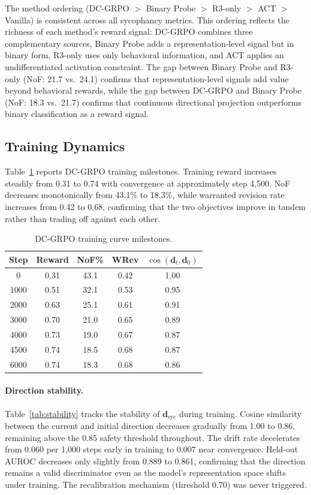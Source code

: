 \documentclass[11pt]{article}
\begin{document}
The method ordering (DC-GRPO $>$ Binary Probe $>$ R3-only $>$ ACT $>$ Vanilla) is consistent across all sycophancy metrics. This ordering reflects the richness of each method's reward signal: DC-GRPO combines three complementary sources, Binary Probe adds a representation-level signal but in binary form, R3-only uses only behavioral information, and ACT applies an undifferentiated activation constraint. The gap between Binary Probe and R3-only (NoF: 21.7 vs.\ 24.1) confirms that representation-level signals add value beyond behavioral rewards, while the gap between DC-GRPO and Binary Probe (NoF: 18.3 vs.\ 21.7) confirms that continuous directional projection outperforms binary classification as a reward signal.

\subsection{Training Dynamics}
\label{sec:training}

Table~\ref{tab:training_curve} reports DC-GRPO training milestones. Training reward increases steadily from 0.31 to 0.74 with convergence at approximately step 4,500. NoF decreases monotonically from 43.1\% to 18.3\%, while warranted revision rate increases from 0.42 to 0.68, confirming that the two objectives improve in tandem rather than trading off against each other.

\begin{table}[h]
\centering
\caption{DC-GRPO training curve milestones.}
\label{tab:training_curve}
\begin{tabular}{ccccc}
\toprule
Step & Reward & NoF\% & WRev & $\cos(\mathbf{d}_t, \mathbf{d}_0)$ \\
\midrule
0    & 0.31 & 43.1 & 0.42 & 1.00 \\
1000 & 0.51 & 32.1 & 0.53 & 0.95 \\
2000 & 0.63 & 25.1 & 0.61 & 0.91 \\
3000 & 0.70 & 21.0 & 0.65 & 0.89 \\
4000 & 0.73 & 19.0 & 0.67 & 0.87 \\
4500 & 0.74 & 18.5 & 0.68 & 0.87 \\
6000 & 0.74 & 18.3 & 0.68 & 0.86 \\
\bottomrule
\end{tabular}
\end{table}

\paragraph{Direction stability.}
Table~\ref{tab:stability} tracks the stability of $\mathbf{d}_\text{syc}$ during training. Cosine similarity between the current and initial direction decreases gradually from 1.00 to 0.86, remaining above the 0.85 safety threshold throughout. The drift rate decelerates from 0.060 per 1,000 steps early in training to 0.007 near convergence. Held-out AUROC decreases only slightly from 0.889 to 0.861, confirming that the direction remains a valid discriminator even as the model's representation space shifts under training. The recalibration mechanism (threshold 0.70) was never triggered.
\end{document}
